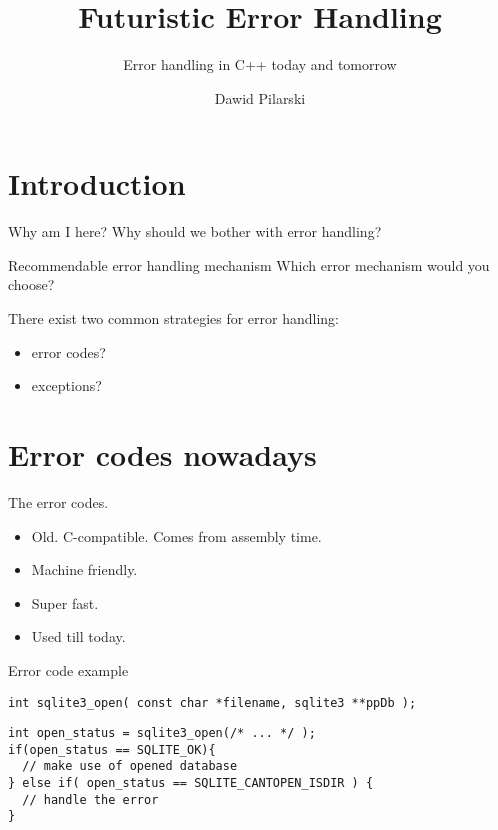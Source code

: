 \documentclass[10pt]{beamer}
\title{Futuristic Error Handling}
\subtitle{Error handling in C++ today and tomorrow}
\date{}
\author{Dawid Pilarski}
\institute{dawid.pilarski@panicsofware.com}
\begin{document}
\maketitle


\section{Introduction}

\begin{frame}{Why am I here?}
	Why should we bother with error handling?
\end{frame}

\begin{frame}{Recommendable error handling mechanism}
	Which error mechanism would you choose?
	
	There exist two common strategies for error handling:
	\begin{itemize}
		\item error codes?
		\item exceptions?
	\end{itemize}
\end{frame}

\section{Error codes nowadays}
\begin{frame}{The error codes.}
	\begin{itemize}[<+- | alert@+>]
		\item Old. C-compatible. Comes from assembly time.
		\item Machine friendly.
		\item Super fast.
		\item Used till today.
	\end{itemize}
\end{frame}

\begin{frame}[fragile]{Error code example}
	\begin{verbatim}
int sqlite3_open( const char *filename, sqlite3 **ppDb );
	\end{verbatim}
	
	\pause
	
	\hrulefill
	
	\begin{verbatim}
int open_status = sqlite3_open(/* ... */ );
if(open_status == SQLITE_OK){
  // make use of opened database
} else if( open_status == SQLITE_CANTOPEN_ISDIR ) {
  // handle the error
}
	\end{verbatim}
	
\end{frame}
\end{document}
